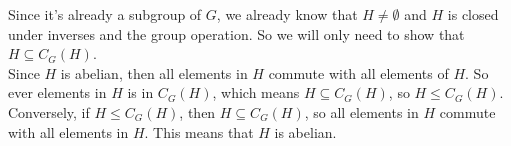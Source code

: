 \documentclass{article}
\begin{document}
\begin{enumerate}[label=\textbf{\alph*.}]
            Since it's already a subgroup of $G$,
            we already know that $H \neq \emptyset$
            and $H$ is closed under inverses and the group operation.
            So we will only need to show that $H \subseteq C_G(H)$. \\
            Since $H$ is abelian, then all elements in $H$
            commute with all elements of $H$.
            So ever elements in $H$ is in $C_G(H)$,
            which means $H \subseteq C_G(H)$,
            so $H \leqslant C_G(H)$. \\
            Conversely, if $H \leqslant C_G(H)$,
            then $H \subseteq C_G(H)$,
            so all elements in $H$ commute with all elements in $H$.
            This means that $H$ is abelian.
    \end{enumerate} 
\end{document}
